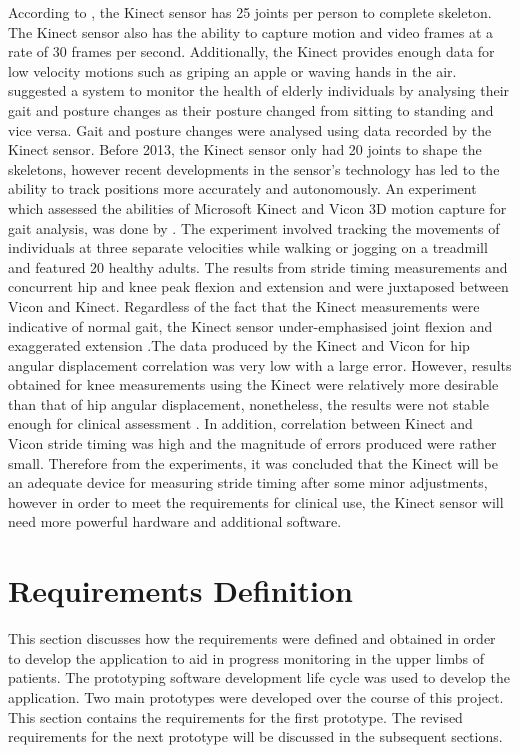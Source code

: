 \documentclass[a4paper, 12pt]{article}
\begin{document}
According to \citet{Microsoft2018}, the Kinect sensor has 25 joints per person to complete skeleton. The Kinect sensor also has the ability to capture motion and video frames at a rate of 30 frames per second. Additionally, the Kinect provides enough data for low velocity motions such as griping an apple or waving hands in the air. \citet{Parajulietal2012} suggested a system to monitor the health of elderly individuals by analysing their gait and posture changes as their posture changed from sitting to standing and vice versa. Gait and posture changes were analysed using data recorded by the Kinect sensor. Before 2013, the Kinect sensor only had 20 joints to shape the skeletons, however recent developments in the sensor's technology has led to the ability to track positions more accurately and autonomously. An experiment which assessed the abilities of Microsoft Kinect and Vicon 3D motion capture for gait analysis, was done by \citet{Pfisteretal2014}. The experiment involved tracking the movements of individuals at three separate velocities while walking or jogging on a treadmill and featured 20 healthy adults. The results from stride timing measurements and concurrent hip and knee peak flexion and extension and were juxtaposed between Vicon and Kinect. Regardless of the fact that the Kinect measurements were indicative of normal gait, the Kinect sensor under-emphasised joint flexion and exaggerated extension \citep{Pfisteretal2014}.The data produced by the Kinect and Vicon for hip angular displacement correlation was very low with a large error. However, results obtained for knee measurements using the Kinect were relatively more desirable than that of hip angular displacement, nonetheless, the results were not stable enough for clinical assessment \citep{Pfisteretal2014}. In addition, correlation between Kinect and Vicon stride timing was high and the magnitude of errors produced were rather small. Therefore from the experiments, it was concluded that the Kinect will be an adequate device for measuring stride timing after some minor adjustments, however in order to meet the requirements for clinical use,  the Kinect sensor will need more powerful hardware and additional software.  


\section{Requirements Definition}

This section discusses how the requirements were defined and obtained in order to develop the application to aid in progress monitoring in the upper limbs of patients. The prototyping software development life cycle was used to develop the application. Two main prototypes were developed over the course of this project. This section contains the requirements for the first prototype. The revised requirements for the next prototype will be discussed in the subsequent sections.
\end{document}
